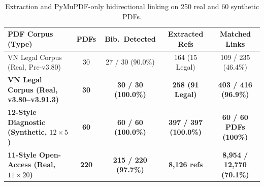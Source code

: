 {\setlength{\tabcolsep}{3.5pt}
\begin{table}[!htbp]
\centering
\caption{Extraction and PyMuPDF-only bidirectional linking on 250 real and 60 synthetic PDFs.}\label{tab:pdf-corpora}
\begin{tabular}{|L{0.34}|C{0.10}|C{0.18}|C{0.19}|C{0.19}|}
\hline
\textbf{PDF Corpus (Type)} & \textbf{PDFs} & \textbf{Bib.\ Detected} & \textbf{Extracted Refs} & \textbf{Matched Links} \\
\hline
VN Legal Corpus (Real, Pre-v3.80) & 30 & 27 / 30 (90.0\%) & 164 (15 Legal) & 109 / 235 (46.4\%) \\
\hline
\textbf{VN Legal Corpus (Real, v3.80--v3.91.3)} & \textbf{30} & \textbf{30 / 30 (100.0\%)} & \textbf{258 (91 Legal)} & \textbf{403 / 416 (96.9\%)} \\
\hline
\textbf{12-Style Diagnostic (Synthetic, $12 \times 5$)} & \textbf{60} & \textbf{60 / 60 (100.0\%)} & \textbf{397 / 397 (100.0\%)} & \textbf{60 / 60 PDFs (100\%)} \\
\hline
\textbf{11-Style Open-Access (Real, $11 \times 20$)} & \textbf{220} & \textbf{215 / 220 (97.7\%)} & \textbf{8,126 refs} & \textbf{8,954 / 12,770 (70.1\%)} \\
\hline
\end{tabular}
\end{table}
}

